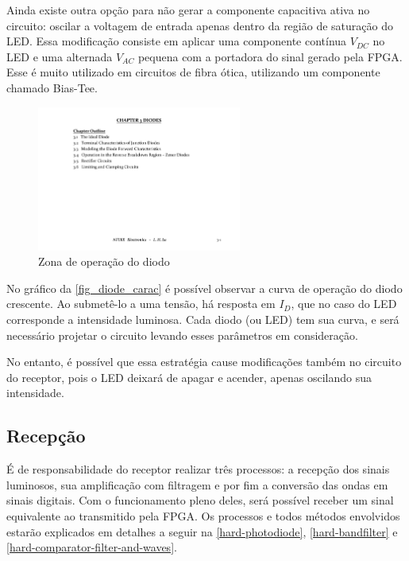 	Ainda existe outra opção para não gerar a componente capacitiva ativa no circuito: oscilar a voltagem de entrada apenas dentro da região de saturação do LED. Essa modificação consiste em aplicar uma componente contínua $V_{DC}$ no LED e uma alternada $V_{AC}$ pequena com a portadora do sinal gerado pela FPGA. Esse é muito utilizado em circuitos de fibra ótica, utilizando um componente chamado Bias-Tee.
	
	\begin{figure}[htb]
		\caption{\label{fig_diode_carac} Zona de operação do diodo}
		\centering
		\includegraphics[page=5,width=0.6\textwidth, trim={16cm 2.5cm 2cm 12.5cm}, clip]{circuits/Electronics_Ch3.pdf}
	\end{figure}
	
	No gráfico da \autoref{fig_diode_carac} é possível observar a curva de operação do diodo crescente. Ao submetê-lo a uma tensão, há resposta em $I_{D}$, que no caso do LED corresponde a intensidade luminosa. Cada diodo (ou LED) tem sua curva, e será necessário projetar o circuito levando esses parâmetros em consideração.
	
	No entanto, é possível que essa estratégia cause modificações também no circuito do receptor, pois o LED deixará de apagar e acender, apenas oscilando sua intensidade.	
	
	\subsection{Recepção}
	
	É de responsabilidade do receptor realizar três processos: a recepção dos sinais luminosos, sua amplificação com filtragem e por fim a conversão das ondas em sinais digitais. Com o funcionamento pleno deles, será possível receber um sinal equivalente ao transmitido pela FPGA. Os processos e todos métodos envolvidos estarão explicados em detalhes a seguir na \autoref{hard-photodiode}, \autoref{hard-bandfilter} e \autoref{hard-comparator-filter-and-waves}.
	
